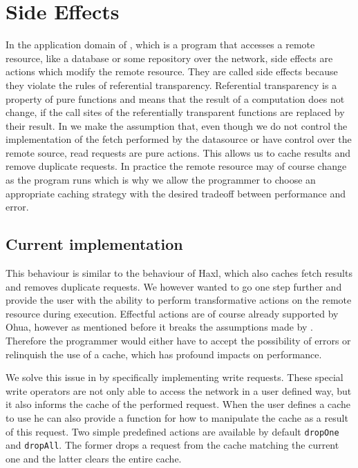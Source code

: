 \chapter{Side Effects}
\label{ch:side-effects}

In the application domain of \yauhau{}, which is a program that accesses a remote resource, like a database or some repository over the network, side effects are actions which modify the remote resource.
They are called side effects because they violate the rules of referential transparency.
Referential transparency is a property of pure functions and means that the result of a computation does not change, if the call sites of the referentially transparent functions are replaced by their result.
In \yauhau{} we make the assumption that, even though we do not control the implementation of the fetch performed by the datasource or have control over the remote source, read requests are pure actions.
This allows us to cache results and remove duplicate requests.
In practice the remote resource may of course change as the program runs which is why we allow the programmer to choose an appropriate caching strategy with the desired tradeoff between performance and error.

\section{Current implementation}

This behaviour is similar to the behaviour of Haxl, which also caches fetch results and removes duplicate requests.
We however wanted to go one step further and provide the user with the ability to perform transformative actions on the remote resource during execution.
Effectful actions are of course already supported by Ohua, however as mentioned before it breaks the assumptions made by \yauhau{}.
Therefore the programmer would either have to accept the possibility of errors or relinquish the use of a cache, which has profound impacts on performance.

We solve this issue in \yauhau{} by specifically implementing write requests.
These special write operators are not only able to access the network in a user defined way, but it also informs the cache of the performed request.
When the user defines a cache to use he can also provide a function for how to manipulate the cache as a result of this request.
Two simple predefined actions are available by default \texttt{dropOne} and \texttt{dropAll}.
The former drops a request from the cache matching the current one and the latter clears the entire cache.

